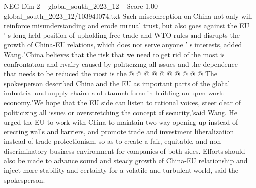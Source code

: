 \begin{textsample}{NEG Dim 2 – global\_south\_2023\_12 – Score 1.00 – global\_south\_2023\_12/103940074.txt}
Such misconception on China not only will reinforce misunderstanding and erode mutual trust, but also goes against the EU ' s long-held position of upholding free trade and WTO rules and disrupts the growth of China-EU relations, which does not serve anyone ' s interests, added Wang."China believes that the risk that we need to get rid of the most is confrontation and rivalry caused by politicizing all issues and the dependence that needs to be reduced the most is the @ @ @ @ @ @ @ @ @ @ The spokesperson described China and the EU as important parts of the global industrial and supply chains and staunch force in building an open world economy."We hope that the EU side can listen to rational voices, steer clear of politicizing all issues or overstretching the concept of security,"said Wang.
He urged the EU to work with China to maintain two-way opening up instead of erecting walls and barriers, and promote trade and investment liberalization instead of trade protectionism, so as to create a fair, equitable, and non-discriminatory business environment for companies of both sides.
Efforts should also be made to advance sound and steady growth of China-EU relationship and inject more stability and certainty for a volatile and turbulent world, said the spokesperson.

\end{textsample}

